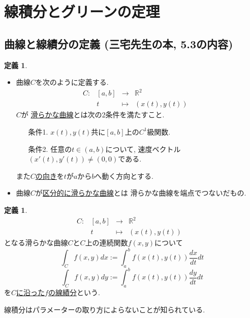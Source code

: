 \documentclass[dvipdfmx,a4paper,11pt]{article}
\newcommand{\R}{\mathbb{R}}
\theoremstyle{definition}
\newtheorem{dfn}[thm]{定義}
\begin{document}
\newpage

\section{線積分とグリーンの定理}

\subsection{曲線と線績分の定義 (三宅先生の本, 5.3の内容)}
 \begin{tcolorbox}[
    colback = white,
    colframe = green!35!black,
    fonttitle = \bfseries,
    breakable = true]
    \begin{dfn}
\begin{itemize}
\item  曲線$C$を次のように定義する.
$$
\begin{array}{ccccc}
C: &[a,b] & \rightarrow & \R^2 & \\
&t & \longmapsto &(x(t), y(t))&
\end{array}
$$
$C$が \underline{滑らかな曲線}とは次の2条件を満たすこと.
\begin{itemize}
\item[条件1.] $x(t),y(t)$共に$[a,b]$上の$C^1$級関数.
\item[条件2.]任意の$t \in (a,b)$について, 速度ベクトル$ (x'(t), y'(t))\neq  (0,0)$である.
\end{itemize}
また\underline{$C$の向き}を$t$が$a$から$b$へ動く方向とする.
\item 曲線$C$が\underline{区分的に滑らかな曲線}とは
滑らかな曲線を端点でつないだもの.
\end{itemize}
     \end{dfn}
    \end{tcolorbox}
    
   \begin{tcolorbox}[
    colback = white,
    colframe = green!35!black,
    fonttitle = \bfseries,
    breakable = true]
    \begin{dfn}
$$
\begin{array}{ccccc}
C: &[a,b] & \rightarrow & \R^2 & \\
&t & \longmapsto &(x(t), y(t))&
\end{array}
$$
となる滑らかな曲線$C$と$C$上の連続関数$f(x,y)$について   
$$
\int_{C}f(x,y)dx := \int_{a}^{b} f(x(t), y(t)) \frac{dx}{dt}dt
$$
$$
\int_{C}f(x,y)dy := \int_{a}^{b} f(x(t), y(t)) \frac{dy}{dt}dt
$$
を\underline{$C$に沿った$f$の線績分}という.
 \end{dfn}
 \end{tcolorbox}
 線積分はパラメーターの取り方によらないことが知られている.
 
\end{document}
